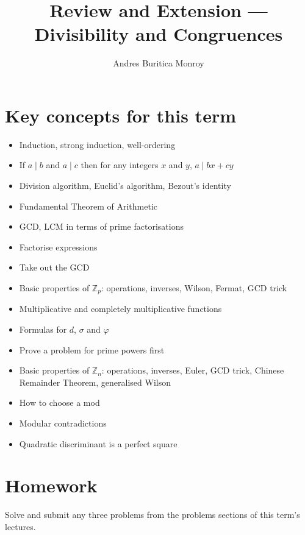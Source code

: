 \documentclass{article}
\title{Review and Extension --- Divisibility and Congruences}
\author{Andres Buritica Monroy}
\date{}
\begin{document}
\maketitle
\section{Key concepts for this term}
\begin{itemize}
	\item Induction, strong induction, well-ordering
	\item If $a\mid b$ and $a\mid c$ then for any integers $x$ and $y$, $a\mid
		      bx+cy$
	\item Division algorithm, Euclid's algorithm, Bezout's identity
	\item Fundamental Theorem of Arithmetic
	\item GCD, LCM in terms of prime factorisations
	\item Factorise expressions
	\item Take out the GCD
	\item Basic properties of $\mathbb Z_p$: operations, inverses, Wilson,
	      Fermat, GCD trick
	\item Multiplicative and completely multiplicative functions
	\item Formulas for $d$, $\sigma$ and $\varphi$
	\item Prove a problem for prime powers first
	\item Basic properties of $\mathbb Z_n$: operations, inverses,
	      Euler, GCD trick, Chinese Remainder Theorem, generalised Wilson
	\item How to choose a mod
	\item Modular contradictions
	\item Quadratic discriminant is a perfect square
\end{itemize}
\section{Homework}
Solve and submit any three problems from the problems sections of this term's
lectures.
\newpage
\end{document}
